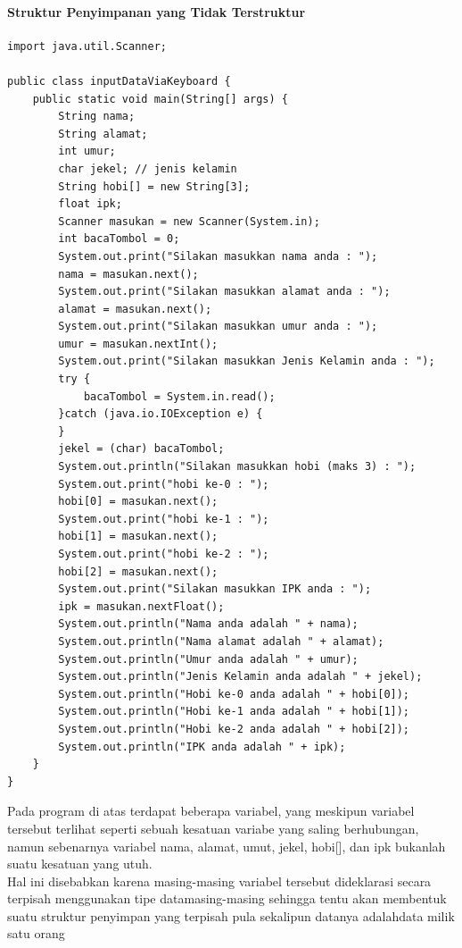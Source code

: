 \documentclass[a4paper,12pt]{article}
\begin{document}
\paragraph*{Struktur Penyimpanan yang Tidak Terstruktur\\}
\begin{lstlisting}
import java.util.Scanner;

public class inputDataViaKeyboard {
    public static void main(String[] args) {
        String nama;
        String alamat;
        int umur;
        char jekel; // jenis kelamin
        String hobi[] = new String[3];
        float ipk;
        Scanner masukan = new Scanner(System.in);
        int bacaTombol = 0;
        System.out.print("Silakan masukkan nama anda : ");
        nama = masukan.next();
        System.out.print("Silakan masukkan alamat anda : ");
        alamat = masukan.next();
        System.out.print("Silakan masukkan umur anda : ");
        umur = masukan.nextInt();
        System.out.print("Silakan masukkan Jenis Kelamin anda : ");
        try {
            bacaTombol = System.in.read();
        }catch (java.io.IOException e) {
        }
        jekel = (char) bacaTombol;
        System.out.println("Silakan masukkan hobi (maks 3) : ");
        System.out.print("hobi ke-0 : ");
        hobi[0] = masukan.next();
        System.out.print("hobi ke-1 : ");
        hobi[1] = masukan.next();
        System.out.print("hobi ke-2 : ");
        hobi[2] = masukan.next();
        System.out.print("Silakan masukkan IPK anda : ");
        ipk = masukan.nextFloat();
        System.out.println("Nama anda adalah " + nama);
        System.out.println("Nama alamat adalah " + alamat);
        System.out.println("Umur anda adalah " + umur);
        System.out.println("Jenis Kelamin anda adalah " + jekel);
        System.out.println("Hobi ke-0 anda adalah " + hobi[0]);
        System.out.println("Hobi ke-1 anda adalah " + hobi[1]);
        System.out.println("Hobi ke-2 anda adalah " + hobi[2]);
        System.out.println("IPK anda adalah " + ipk);
    }
}
\end{lstlisting}
Pada program di atas terdapat beberapa variabel, yang meskipun variabel tersebut terlihat seperti sebuah kesatuan
variabe yang saling berhubungan, namun sebenarnya variabel nama, alamat, umut, jekel, hobi[], dan ipk bukanlah suatu
kesatuan yang utuh.\\
Hal ini disebabkan karena masing-masing variabel tersebut dideklarasi secara terpisah menggunakan tipe datamasing-masing
sehingga tentu akan membentuk suatu struktur penyimpan yang terpisah pula sekalipun datanya adalahdata milik satu orang
\end{document}
